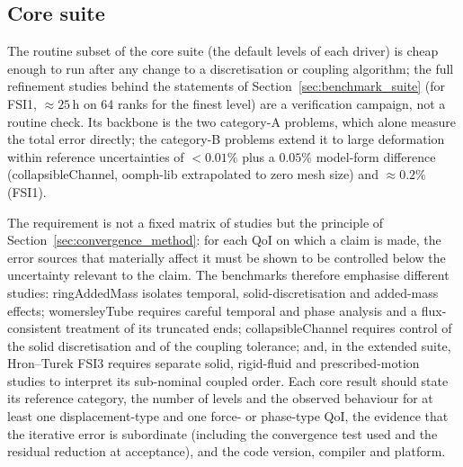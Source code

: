 \subsection{Core suite}\label{sec:core_suite}

The routine subset of the core suite (the default levels of each driver) is cheap enough to run after any change to a discretisation or coupling algorithm; the full refinement studies behind the statements of Section~\ref{sec:benchmark_suite} (for FSI1, $\approx25$\,h on 64 ranks for the finest level) are a verification campaign, not a routine check.
Its backbone is the two category-A problems, which alone measure the total error directly; the category-B problems extend it to large deformation within reference uncertainties of $<0.01\%$ plus a $0.05\%$ model-form difference (collapsibleChannel, oomph-lib extrapolated to zero mesh size) and $\approx0.2\%$ (FSI1).

The requirement is not a fixed matrix of studies but the principle of Section~\ref{sec:convergence_method}: for each QoI on which a claim is made, the error sources that materially affect it must be shown to be controlled below the uncertainty relevant to the claim.
The benchmarks therefore emphasise different studies: ringAddedMass isolates temporal, solid-discretisation and added-mass effects; womersleyTube requires careful temporal and phase analysis and a flux-consistent treatment of its truncated ends; collapsibleChannel requires control of the solid discretisation and of the coupling tolerance; and, in the extended suite, Hron--Turek FSI3 requires separate solid, rigid-fluid and prescribed-motion studies to interpret its sub-nominal coupled order.
Each core result should state its reference category, the number of levels and the observed behaviour for at least one displacement-type and one force- or phase-type QoI, the evidence that the iterative error is subordinate (including the convergence test used and the residual reduction at acceptance), and the code version, compiler and platform.


